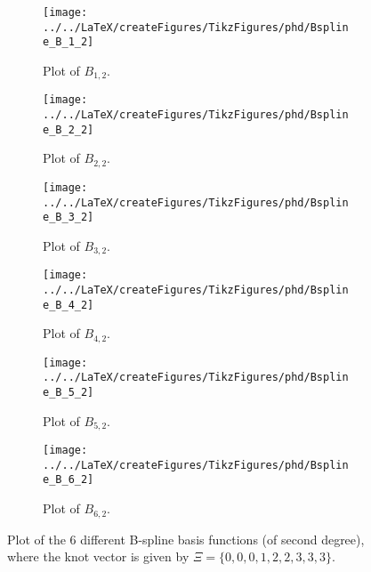 \begin{figure}
        \begin{subfigure}{0.33\textwidth}
       		\centering
			\texttt{[image: ../../LaTeX/createFigures/TikzFigures/phd/Bspline\_B\_1\_2]}
            \caption{Plot of $B_{1,2}$.}
        \end{subfigure}%
        \hspace*{0.005\textwidth}%
        \begin{subfigure}{0.33\textwidth}
       		\centering
			\texttt{[image: ../../LaTeX/createFigures/TikzFigures/phd/Bspline\_B\_2\_2]}
            \caption{Plot of $B_{2,2}$.}
        \end{subfigure}%
        \hspace*{0.005\textwidth}%
        \begin{subfigure}{0.33\textwidth}
       		\centering
			\texttt{[image: ../../LaTeX/createFigures/TikzFigures/phd/Bspline\_B\_3\_2]}
            \caption{Plot of $B_{3,2}$.}
        \end{subfigure}
		\par\bigskip	
		\par\bigskip	
        \begin{subfigure}{0.33\textwidth}
       		\centering
			\texttt{[image: ../../LaTeX/createFigures/TikzFigures/phd/Bspline\_B\_4\_2]}
            \caption{Plot of $B_{4,2}$.}
        \end{subfigure}%
        \hspace*{0.005\textwidth}%
        \begin{subfigure}{0.33\textwidth}
       		\centering
			\texttt{[image: ../../LaTeX/createFigures/TikzFigures/phd/Bspline\_B\_5\_2]}
            \caption{Plot of $B_{5,2}$.}
        \end{subfigure}%
        \hspace*{0.005\textwidth}%
        \begin{subfigure}{0.33\textwidth}
       		\centering
			\texttt{[image: ../../LaTeX/createFigures/TikzFigures/phd/Bspline\_B\_6\_2]}
            \caption{Plot of $B_{6,2}$.}
        \end{subfigure}
        \caption[Plot of B-splines with $\check{p}=2$]{Plot of the 6 different B-spline basis functions (of second degree), where the knot vector is given by $\Xi = \{0, 0, 0, 1, 2, 2, 3, 3, 3\}$.}
        \label{Fig:Bsplines_p2}   
\end{figure}
